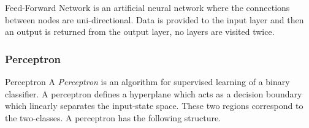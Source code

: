 \documentclass[11pt,a4paper]{article}
\begin{document}
\begin{definition}{Feed-Forward Network} is an artificial neural network where the connections between nodes are uni-directional. Data is provided to the input layer and then an output is returned from the output layer, no layers are visited twice.

\end{definition}

\subsubsection{Perceptron}

\begin{definition}{Perceptron}
  A \textit{Perceptron} is an algorithm for supervised learning of a binary classifier. A perceptron defines a hyperplane which acts as a decision boundary which linearly separates the input-state space. These two regions correspond to the two-classes. A perceptron has the following structure.

  \begin{center}
\end{center}
\end{definition}
\end{document}
